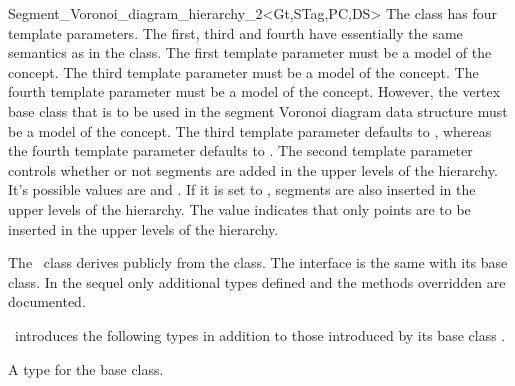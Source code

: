 \begin{ccRefClass}{Segment_Voronoi_diagram_hierarchy_2<Gt,STag,PC,DS>}
The class has four template parameters. The first, third and fourth
have essentially the same semantics as in the
 class. The
first template parameter must be a model of the
 concept.
The third template parameter must be a model of the
 concept. The fourth template parameter must be a
model of the 
concept. However, the vertex base class that is to be used in the
segment Voronoi diagram data structure must
be a model of the 
concept. The third template parameter defaults to
, whereas the fourth template parameter defaults to
. The second template
parameter controls whether or not segments are added in the upper
levels of the hierarchy. It's possible values are 
and . If it is set to ,
segments are also inserted in the upper levels of the hierarchy. The
value  indicates that only points are to be
inserted in the upper levels of the hierarchy.


The \ccRefName\ class derives publicly from the
 class. The interface is
the same with its base class. In the sequel only additional types
defined and the methods overridden are documented.





\ccInheritsFrom
{}


\ccTypes
\ccRefName\ introduces the following types in addition to those
introduced by its base class
.

\ccThreeToTwo
{}
\ccGlue
{}
	  {A type for the base class.}


\end{ccRefClass}
